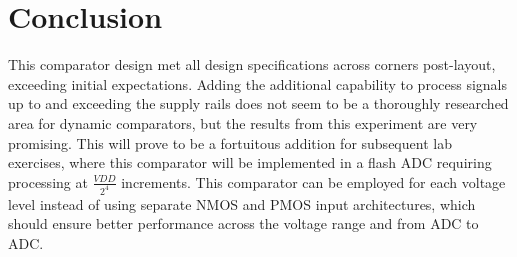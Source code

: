 \documentclass[11pt,letterpaper]{article}
\begin{document}
\section{Conclusion}

This comparator design met all design specifications across corners post-layout, exceeding initial expectations. Adding the additional capability to process signals up to and exceeding the supply rails does not seem to be a thoroughly researched area for dynamic comparators, but the results from this experiment are very promising. This will prove to be a fortuitous addition for subsequent lab exercises, where this comparator will be implemented in a flash ADC requiring processing at $\frac{VDD}{2^4}$ increments. This comparator can be employed for each voltage level instead of using separate NMOS and PMOS input architectures, which should ensure better performance across the voltage range and from ADC to ADC.

\newpage



\end{document}
